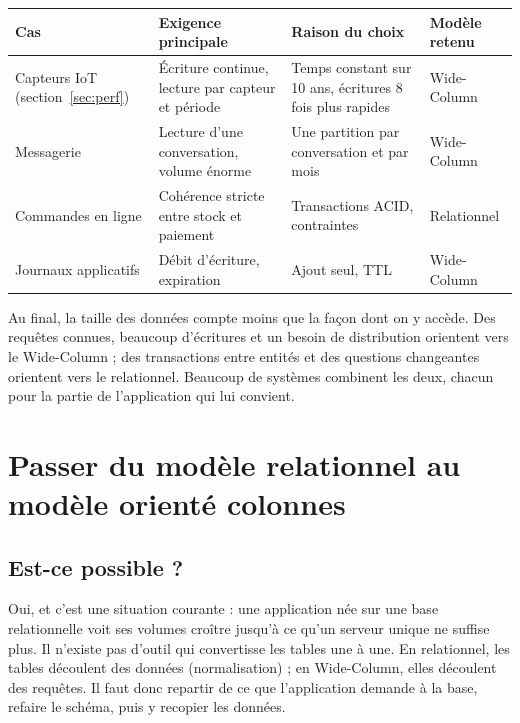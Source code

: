 \documentclass[11pt,a4paper]{article}
\begin{document}
\begin{center}
\small
\begin{tabularx}{\textwidth}{@{}>{\raggedright\arraybackslash}p{3.2cm}>{\raggedright\arraybackslash}X>{\raggedright\arraybackslash}X>{\raggedright\arraybackslash}p{2.6cm}@{}}
\toprule
Cas & Exigence principale & Raison du choix & Modèle retenu \\
\midrule
Capteurs IoT (section~\ref{sec:perf}) & Écriture continue, lecture par capteur et période & Temps constant sur 10 ans, écritures 8 fois plus rapides & Wide-Column \\
Messagerie & Lecture d'une conversation, volume énorme & Une partition par conversation et par mois & Wide-Column \\
Commandes en ligne & Cohérence stricte entre stock et paiement & Transactions ACID, contraintes & Relationnel \\
Journaux applicatifs & Débit d'écriture, expiration & Ajout seul, TTL & Wide-Column \\
\bottomrule
\end{tabularx}
\end{center}

Au final, la taille des données compte moins que la façon dont on y accède. Des requêtes connues, beaucoup d'écritures et un besoin de distribution orientent vers le Wide-Column ; des transactions entre entités et des questions changeantes orientent vers le relationnel. Beaucoup de systèmes combinent les deux, chacun pour la partie de l'application qui lui convient.

\section{Passer du modèle relationnel au modèle orienté colonnes}
\label{sec:migration}

\subsection{Est-ce possible ?}
Oui, et c'est une situation courante : une application née sur une base relationnelle voit ses volumes croître jusqu'à ce qu'un serveur unique ne suffise plus. Il n'existe pas d'outil qui convertisse les tables une à une. En relationnel, les tables découlent des données (normalisation) ; en Wide-Column, elles découlent des requêtes. Il faut donc repartir de ce que l'application demande à la base, refaire le schéma, puis y recopier les données.
\end{document}
